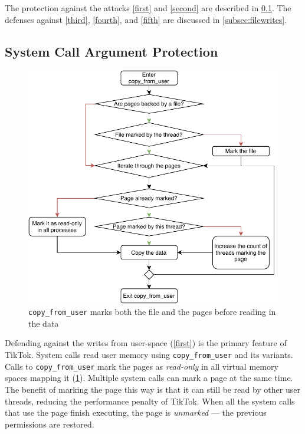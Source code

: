 The protection against the attacks \ref{first} and \ref{second} are described in
\cref{subsec:memorywrites}. The defenses against \ref{third}, \ref{fourth}, and
\ref{fifth} are discussed in \cref{subsec:filewrites}.


\subsection{System Call Argument Protection}


\label{subsec:memorywrites}
\begin{figure}[]
  \centering
  \includegraphics[width = .45 \textwidth]{img/copy_from_user.pdf}
  \caption{\texttt{copy\_from\_user} marks both the file and the pages before
  reading in the data}
  \label{fig:copyfromuser}
\end{figure}

Defending against the writes from user-space (\cref{first}) is the primary
feature of TikTok. System calls read user memory using \texttt{copy\_from\_user}
and its variants. Calls to \texttt{copy\_from\_user} mark the pages as
\emph{read-only} in all virtual memory spaces mapping it (\cref{fig:copyfromuser}). Multiple system
calls can mark a page at the same time. The benefit of marking the page this way
is that it can still be read by other user threads, reducing the performance
penalty of TikTok. When all the system calls that use the page finish executing,
the page is \emph{unmarked} --- the previous permissions are restored.

